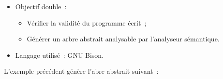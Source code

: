 \begin{frame}
	\begin{itemize}
	\item Objectif double~: 
		\begin{itemize}
		\item Vérifier la validité du programme écrit~;
		\item Générer un arbre abstrait analysable par l'analyseur sémantique.
		\end{itemize}
	\item Langage utilisé~: GNU Bison.
	\end{itemize}
\end{frame}

\begin{frame}
L'exemple précédent génère l'abre abstrait suivant~:
\end{frame}


